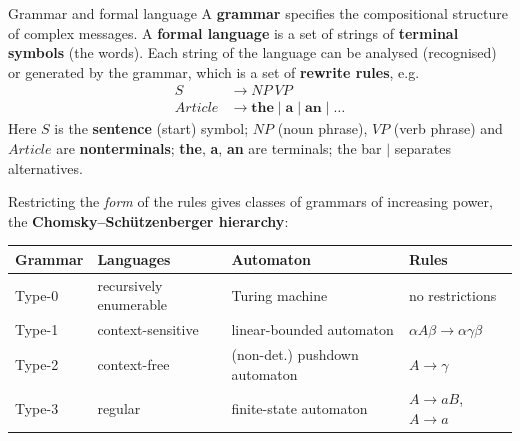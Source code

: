 \begin{nbdef}{Grammar and formal language}
A \textbf{grammar} specifies the compositional structure of complex messages. A
\textbf{formal language} is a set of strings of \textbf{terminal symbols} (the words).
Each string of the language can be analysed (recognised) or generated by the grammar,
which is a set of \textbf{rewrite rules}, e.g.
\begin{align*}
  S &\to NP\ VP\\
  Article &\to \textbf{the} \mid \textbf{a} \mid \textbf{an} \mid \dots
\end{align*}
Here $S$ is the \textbf{sentence} (start) symbol; $NP$ (noun phrase), $VP$ (verb
phrase) and $Article$ are \textbf{nonterminals}; \textbf{the}, \textbf{a}, \textbf{an}
are terminals; the bar $\mid$ separates alternatives.
\end{nbdef}

Restricting the \emph{form} of the rules gives classes of grammars of increasing power,
the \textbf{Chomsky--Schützenberger hierarchy}:

\begin{center}
\small
\begin{tabular}{@{}l l l l@{}}
\toprule
\textbf{Grammar} & \textbf{Languages} & \textbf{Automaton} & \textbf{Rules} \\
\midrule
Type-0 & recursively enumerable & Turing machine & no restrictions \\
Type-1 & context-sensitive & linear-bounded automaton & $\alpha A \beta \to \alpha\gamma\beta$ \\
Type-2 & context-free & (non-det.) pushdown automaton & $A \to \gamma$ \\
Type-3 & regular & finite-state automaton & $A \to aB$, \ $A \to a$ \\
\bottomrule
\end{tabular}
\end{center}

\begin{center}
\end{center}


